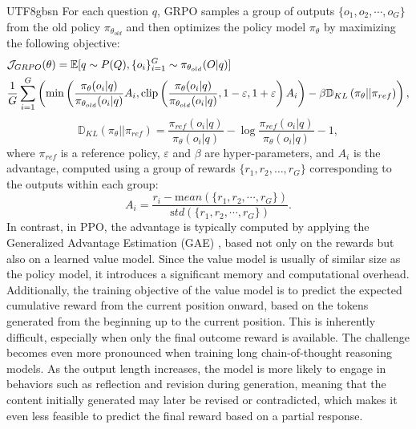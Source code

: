 \documentclass[11pt, a4paper, logo, copyright, nonumbering]{deepseek}
\renewcommand{\epsilon}{\varepsilon}
\begin{document}
\begin{CJK*}{UTF8}{gbsn}
For each question $q$, GRPO samples a group of outputs $\{o_1, o_2, \cdots, o_G\}$ from the old policy $\pi_{\theta_{old}}$ and then optimizes the policy model $\pi_{\theta}$ by maximizing the following objective:
\begin{equation}
\begin{split}
    \footnotesize
    & \mathcal{J}_{GRPO}(\theta) = \mathbb{E}{[q \sim P(Q), \{o_i\}_{i=1}^G \sim \pi_{\theta_{old}}(O|q)]}  \\
    & \frac{1}{G}\sum_{i=1}^G \left( \min \left( \frac{\pi_\theta(o_i |q)}{\pi_{\theta_{old}}(o_i |q)} A_i, \text{clip} \left( \frac{\pi_\theta(o_i |q)}{\pi_{\theta_{old}}(o_i |q)}, 1 - \epsilon, 1 + \epsilon \right)  A_i \right) - \beta \mathbb{D}_{KL}\left(\pi_{\theta} || \pi_{ref}\right)\right) ,
\end{split}
\label{eq:GRPO-obj}
\end{equation}
\begin{equation}
    \mathbb{D}_{KL}\left(\pi_{\theta} || \pi_{ref}\right) = \frac{\pi_{ref}(o_i|q)}{\pi_{\theta}(o_i|q)}- \log\frac{\pi_{ref}(o_i|q)}{\pi_{\theta}(o_i|q)} - 1,
\end{equation}
where $\pi_{ref}$ is a reference policy, $\epsilon$ and $\beta$ are hyper-parameters, and $A_i$ is the advantage, computed using a group of rewards $\{r_1, r_2, \ldots, r_G\}$ corresponding to the outputs within each group:
\begin{equation}
    A_i = \frac{r_i - {\mathrm mean(\{r_1, r_2, \cdots, r_G\})}}{{\mathrm std(\{r_1, r_2, \cdots, r_G\})}}.
\end{equation}
In contrast, in PPO, the advantage is typically computed by applying the Generalized Advantage Estimation (GAE) \citep{gae}, based not only on the rewards but also on a learned value model. Since the value model is usually of similar size as the policy model, it introduces a significant memory and computational overhead. Additionally, the training objective of the value model is to predict the expected cumulative reward from the current position onward, based on the tokens generated from the beginning up to the current position. This is inherently difficult, especially when only the final outcome reward is available. The challenge becomes even more pronounced when training long chain-of-thought reasoning models. As the output length increases, the model is more likely to engage in behaviors such as reflection and revision during generation, meaning that the content initially generated may later be revised or contradicted, which makes it even less feasible to predict the final reward based on a partial response. 


\end{CJK*}
\end{document}
